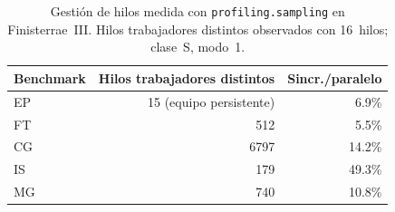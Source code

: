 \begin{table}[htbp]
\centering
\small
\begin{tabular}{lrr}
\hline
Benchmark & Hilos trabajadores distintos & Sincr./paralelo \\
\hline
EP & 15 (equipo persistente) & 6.9\% \\
FT & 512 & 5.5\% \\
CG & 6797 & 14.2\% \\
IS & 179 & 49.3\% \\
MG & 740 & 10.8\% \\
\hline
\end{tabular}
\caption{Gestión de hilos medida con \texttt{profiling.sampling} en
Finisterrae~III. Hilos trabajadores distintos observados con 16~hilos;
clase~S, modo~1.}
\label{tab:profiling-py315-churn}
\end{table}
